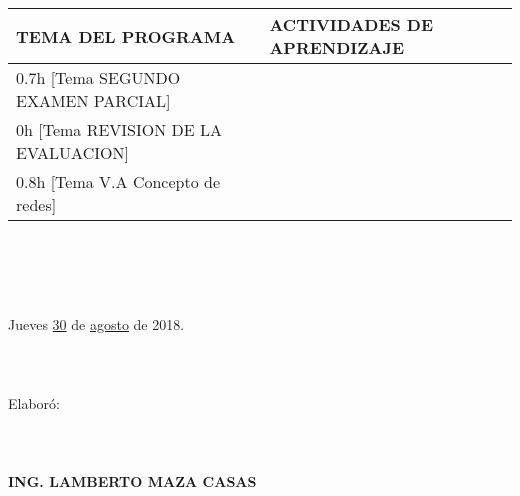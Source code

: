 \documentclass[landscape]{article}
\begin{document}
{\begin{center}
\begin{tabular}{|p{11cm}|p{8cm}|}
{\bf TEMA DEL PROGRAMA}&{\bf ACTIVIDADES DE APRENDIZAJE}\\\hline
	0.7h	[Tema SEGUNDO EXAMEN PARCIAL]
&\\
	0h	[Tema REVISION DE LA EVALUACION]
&\\
	0.8h	[Tema V.A Concepto de redes]
&\\
\hline
\end{tabular}
\ \\
\ \\
\ \\
\ \\
Jueves \underline{\hspace{0.5cm}30\hspace{0.5cm}} de  \underline{\hspace{0.5cm}agosto\hspace{0.5cm}} de 2018.
\ \\
\ \\
\ \\
\ \\
Elabor\'o:
\ \\
\ \\
\ \\
\ \\
{\bf ING. LAMBERTO MAZA CASAS}
\end{center}
\eject
}
\end{document}
